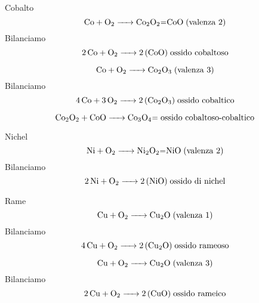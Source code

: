 Cobalto
$$\ce{ Co + O_2 -> Co_2O_2=CoO} \; \text{(valenza 2)}$$
Bilanciamo
$$\ce{ 2 Co + O_2 -> 2 (CoO)} \; \text{ossido cobaltoso}$$

$$\ce{ Co + O_2 -> Co_2O_3} \; \text{(valenza 3)}$$ Bilanciamo
$$\ce{ 4 Co + 3 O_2 -> 2 (Co_2O_3)} \; \text{ossido cobaltico}$$

$$\ce{ Co_2O_2 + CoO -> Co_3O_4=} \; \text{ossido cobaltoso-cobaltico}$$

Nichel
$$\ce{ Ni + O_2 -> Ni_2O_2=NiO} \; \text{(valenza 2)}$$
Bilanciamo
$$\ce{ 2 Ni + O_2 -> 2 (NiO)} \; \text{ossido di nichel}$$

Rame
$$\ce{ Cu + O_2 -> Cu_2O} \; \text{(valenza 1)}$$
Bilanciamo
$$\ce{ 4 Cu + O_2 -> 2 (Cu_2O)} \; \text{ossido rameoso}$$

$$\ce{ Cu + O_2 -> Cu_2O} \; \text{(valenza 3)}$$
Bilanciamo
$$\ce{ 2 Cu + O_2 -> 2 (CuO)} \; \text{ossido rameico}$$